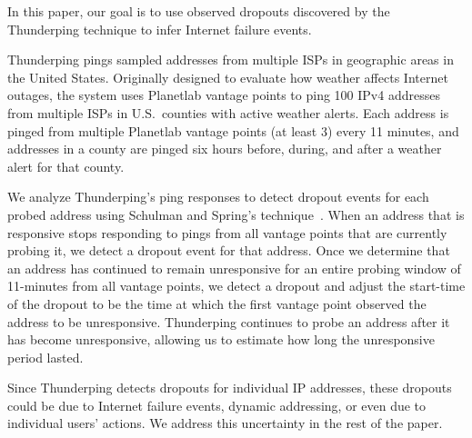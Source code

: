 In this paper, our goal is to use observed dropouts discovered by the
Thunderping technique to infer Internet failure events. 

Thunderping pings
sampled addresses from multiple ISPs in geographic areas in the United
States. Originally designed to evaluate how weather affects Internet
outages, the system uses Planetlab vantage points to ping 100 IPv4
addresses from multiple ISPs in U.S.~counties with active
weather alerts. Each address is pinged from multiple Planetlab vantage
points (at least 3) every 11 minutes, and addresses in a county are
pinged six hours before, during, and after a weather alert for that
county. 


We analyze Thunderping's ping responses to detect dropout events for each probed
address using Schulman and Spring's technique~\cite{pingin}. When an address that is responsive stops responding to pings
from all vantage points that are currently probing it, we detect a
dropout event for that address. Once we determine that an address has
continued to remain unresponsive for an entire probing window of
11-minutes from all vantage points, we detect a dropout and
adjust the start-time of the dropout to be the time at which the first
vantage point observed the address to be unresponsive. Thunderping
continues to probe an address after it has become unresponsive, allowing us to estimate how long the unresponsive period lasted.

Since Thunderping
detects dropouts for individual IP addresses, these dropouts could
be due to Internet failure events, dynamic addressing, or even due to 
individual users' actions. We address this uncertainty in the rest of
the paper.




